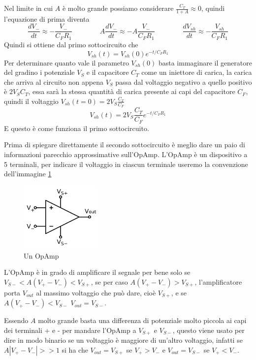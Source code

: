 \documentclass{article}
\newcommand{\vz}{V_{sh}(0)}
\begin{document}
		Nel limite in cui $A$ è molto grande possiamo considerare $\frac{C_T}{1+A}\approx0$, quindi l'equazione di prima diventa
		\[
			\frac{dV_-}{dt}\approx-\frac{V_-}{C_FR_1}\qquad\qquad
			A\frac{dV_-}{dt}\approx-A\frac{V_-}{C_FR_1}\qquad\qquad
			\frac{dV_{sh}}{dt}\approx-\frac{V_{sh}}{C_FR_1}
		\]
		Quindi si ottiene dal primo sottocircuito che\newline
		\[
			V_{sh}(t)=V_{sh}(0)e^{-t/C_FR_1}
		\]
		Per determinare quanto vale il parametro $\vz$ basta immaginare il generatore del gradino i potenziale $V_S$ e il capacitore $C_T$ come un iniettore di carica, la carica che arriva al circuito non appena $V_S$ passa dal voltaggio negativo a quello positivo è $2V_SC_T$, essa sarà la stessa quantità di carica presente ai capi del capacitore $C_F$, quindi il voltaggio $V_{sh}(t=0)=2V_S\frac{C_T}{C_F}$
		\begin{equation}
			V_{sh}(t)=2V_S\frac{C_T}{C_F}e^{-t/C_FR_1}	
		\end{equation}
		E questo è come funziona il primo sottocircuito.\newline

		Prima di spiegare direttamente il secondo sottocircuito è meglio dare un paio di informazioni parecchio approssimative sull'OpAmp.\newline
		L'OpAmp è un dispositivo a 5 terminali, per indicare il voltaggio in ciascun terminale useremo la convenzione dell'immagine \ref{fig:OpAmp1}\newline
		\begin{figure}
			\centering
			\includegraphics[width=40mm]{immagini/OpAmp1.png}
			\caption{Un OpAmp}
			\label{fig:OpAmp1}
		\end{figure}
		L'OpAmp è in grado di amplificare il segnale per bene solo se $V_{S-}<A(V_+-V_-)<V_{S+}$, se per caso $A(V_+-V_-)>V_{S+}$, l'amplificatore porta $V_{out}$ al massimo voltaggio che può dare, cioè $V_{S+}$, e se $A(V_+-V_-)<V_{S-}$ $V_{out}=V_{S-}$.\newline

		Essendo $A$ molto grande basta una differenza di potenziale molto piccola ai capi dei terminali + e - per mandare l'OpAmp a $V_{S+}$ e $V_{S-}$, questo viene usato per dire in modo binario se un voltaggio è maggiore di un'altro voltaggio, infatti se $A|V_+-V_-|>>1$ si ha che $V_{out}=V_{S+}$ se $V_+>V_-$ e $V_{out}=V_{S-}$ se $V_+<V_-$.\newline
\end{document}
